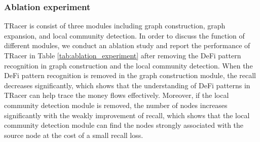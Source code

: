 \subsubsection{Ablation experiment}
\begin{table}[t]
  \caption{Ablation experiment.}
  \label{tab:ablation_experiment}
\end{table}
TRacer is consist of three modules including graph construction, graph expansion, and local community detection. 
In order to discuss the function of different modules, we conduct an ablation study and report the performance of TRacer in Table \ref{tab:ablation_experiment} after removing the DeFi pattern recognition in graph construction and the local community detection.
When the DeFi pattern recognition is removed in the graph construction module, the recall decreases significantly, which shows that the understanding of DeFi patterns in TRacer can help trace the money flows effectively.
Moreover, if the local community detection module is removed, the number of nodes increases significantly with the weakly improvement of recall, which shows that the local community detection module can find the nodes strongly associated with the source node at the cost of a small recall loss.

